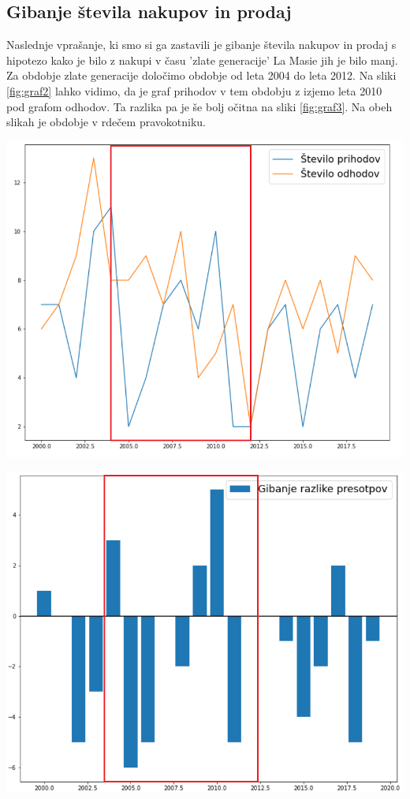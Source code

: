\documentclass[a4paper, 12pt]{article}
\begin{document}
\subsection{Gibanje števila nakupov in prodaj}
Naslednje vprašanje, ki smo si ga zastavili je gibanje števila nakupov in prodaj s hipotezo kako je bilo z nakupi v času 'zlate generacije' La Masie jih je bilo manj. Za obdobje zlate generacije določimo obdobje od leta 2004 do leta 2012. Na sliki \ref{fig:graf2} lahko vidimo, da je graf prihodov v tem obdobju z izjemo leta 2010 pod grafom odhodov. Ta razlika pa je še bolj očitna na sliki \ref{fig:graf3}. Na obeh slikah je obdobje v rdečem pravokotniku.

\begin{minipage}{0.49\textwidth}
\includegraphics[width=1\textwidth]{graf2}
\label{fig:graf2}
\end{minipage}
\begin{minipage}{0.49\textwidth}
\includegraphics[width=1\textwidth]{graf3}
\label{fig:graf3}
\end{minipage} \medskip
\end{document}
